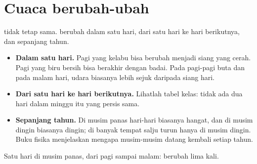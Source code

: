 \section{Cuaca berubah-ubah}

 tidak tetap sama.  berubah dalam satu hari, dari satu hari ke
hari berikutnya, dan sepanjang tahun.

\begin{itemize}
  \item \textbf{Dalam satu hari.} Pagi yang kelabu bisa berubah menjadi
        siang yang cerah. Pagi yang biru bersih bisa berakhir dengan badai.
        Pada pagi-pagi buta dan pada malam hari, udara biasanya lebih sejuk
        daripada siang hari.
  \item \textbf{Dari satu hari ke hari berikutnya.} Lihatlah tabel kelas:
        tidak ada dua hari dalam minggu itu yang persis sama.
  \item \textbf{Sepanjang tahun.} Di musim panas hari-hari biasanya hangat,
        dan di musim dingin biasanya dingin; di banyak tempat salju turun
        hanya di musim dingin. Buku fisika menjelaskan mengapa musim-musim
        datang kembali setiap tahun.
\end{itemize}

\begin{omfigure}

{\small Satu hari di musim panas, dari pagi sampai malam:  berubah
lima kali.}
\label{fig:g1:watching-the-weather:day}
\end{omfigure}

